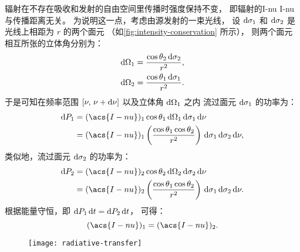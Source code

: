 辐射在不存在吸收和发射的自由空间里传播时强度保持不变，
即辐射的\acl*{I-nu} \acs*{I-nu} 与传播距离无关。
为说明这一点，考虑由源发射的一束光线，
设 $\mathrm{d}\sigma_1$ 和 $\mathrm{d}\sigma_2$ 是光线上相距为 $r$ 的两个面元
（如\autoref{fig:intensity-conservation} 所示），
则两个面元相互所张的立体角分别为：
\begin{align}
  \mathrm{d}\Omega_1 & = \frac{\cos\theta_2 \,\mathrm{d}\sigma_2}{r^2} , \\
  \mathrm{d}\Omega_2 & = \frac{\cos\theta_1 \,\mathrm{d}\sigma_1}{r^2} .
\end{align}
于是可知在频率范围 $[\nu, \,\nu+\mathrm{d}\nu]$ 以及立体角 $\mathrm{d}\Omega_1$ 之内
流过面元 $\mathrm{d}\sigma_1$ 的功率为：
\begin{align}
  \D{P_1} & = (\acs{I-nu})_1 \cos\theta_1
      \,\D{\Omega_1} \,\D{\sigma_1} \,\D{\nu}  \\
    & = (\acs{I-nu})_1 \left( \frac{\cos\theta_1 \cos\theta_2}{r^2} \right)
      \,\D{\sigma_1} \,\D{\sigma_2} \,\D{\nu} ,
\end{align}
类似地，流过面元 $\mathrm{d}\sigma_2$ 的功率为：
\begin{align}
  \D{P_2} & = (\acs{I-nu})_2 \cos\theta_2
      \,\D{\Omega_2} \,\D{\sigma_2} \,\D{\nu}  \\
    & = (\acs{I-nu})_2 \left( \frac{\cos\theta_1 \cos\theta_2}{r^2} \right)
      \,\D{\sigma_1} \,\D{\sigma_2} \,\D{\nu} .
\end{align}
根据能量守恒，即 $\mathrm{d}P_1\,\mathrm{d}t = \mathrm{d}P_2\,\mathrm{d}t$，
可得：
\begin{equation}
  \label{eq:intensity-conservation}
  (\acs{I-nu})_1 = (\acs{I-nu})_2 .
\end{equation}

\begin{figure}[htp]
  \centering
  \texttt{[image: radiative-transfer]}
  \label{fig:radiative-transfer}
\end{figure}

